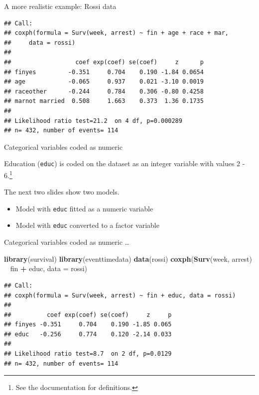 \documentclass[ignorenonframetext,]{beamer}
\newenvironment{Shaded}{\begin{snugshade}}{\end{snugshade}}
\newcommand{\DataTypeTok}[1]{\textcolor[rgb]{0.13,0.29,0.53}{#1}}
\newcommand{\KeywordTok}[1]{\textcolor[rgb]{0.13,0.29,0.53}{\textbf{#1}}}
\newcommand{\NormalTok}[1]{#1}
\newcommand{\OperatorTok}[1]{\textcolor[rgb]{0.81,0.36,0.00}{\textbf{#1}}}
\newcommand{\StringTok}[1]{\textcolor[rgb]{0.31,0.60,0.02}{#1}}
\begin{document}
\begin{frame}[fragile]{%
\protect\hypertarget{a-more-realistic-example-rossi-data-1}{%
A more realistic example: Rossi data}}

\footnotesize

\begin{verbatim}
## Call:
## coxph(formula = Surv(week, arrest) ~ fin + age + race + mar, 
##     data = rossi)
## 
##                  coef exp(coef) se(coef)     z      p
## finyes         -0.351     0.704    0.190 -1.84 0.0654
## age            -0.065     0.937    0.021 -3.10 0.0019
## raceother      -0.244     0.784    0.306 -0.80 0.4258
## marnot married  0.508     1.663    0.373  1.36 0.1735
## 
## Likelihood ratio test=21.2  on 4 df, p=0.000289
## n= 432, number of events= 114
\end{verbatim}

\normalsize

\end{frame}

\begin{frame}{%
\protect\hypertarget{categorical-variables-coded-as-numeric}{%
Categorical variables coded as numeric}}

Education (\texttt{educ}) is coded on the dataset as an integer variable
with values 2 - 6.\footnote{See the documentation for definitions.}

The next two slides show two models.

\begin{itemize}
\item
  Model with \texttt{educ} fitted as a numeric variable
\item
  Model with \texttt{educ} converted to a factor variable
\end{itemize}

\end{frame}

\begin{frame}[fragile]{%
\protect\hypertarget{categorical-variables-coded-as-numeric-1}{%
Categorical variables coded as numeric \ldots}}

\small

\begin{Shaded}
\begin{Highlighting}[]
\KeywordTok{library}\NormalTok{(survival)}
\KeywordTok{library}\NormalTok{(eventtimedata)}
\KeywordTok{data}\NormalTok{(rossi)}
\KeywordTok{coxph}\NormalTok{(}\KeywordTok{Surv}\NormalTok{(week, arrest) }\OperatorTok{~}\StringTok{ }\NormalTok{fin }\OperatorTok{+}\StringTok{ }\NormalTok{educ, }\DataTypeTok{data =}\NormalTok{ rossi)}
\end{Highlighting}
\end{Shaded}

\begin{verbatim}
## Call:
## coxph(formula = Surv(week, arrest) ~ fin + educ, data = rossi)
## 
##          coef exp(coef) se(coef)     z     p
## finyes -0.351     0.704    0.190 -1.85 0.065
## educ   -0.256     0.774    0.120 -2.14 0.033
## 
## Likelihood ratio test=8.7  on 2 df, p=0.0129
## n= 432, number of events= 114
\end{verbatim}

\end{frame}
\end{document}
